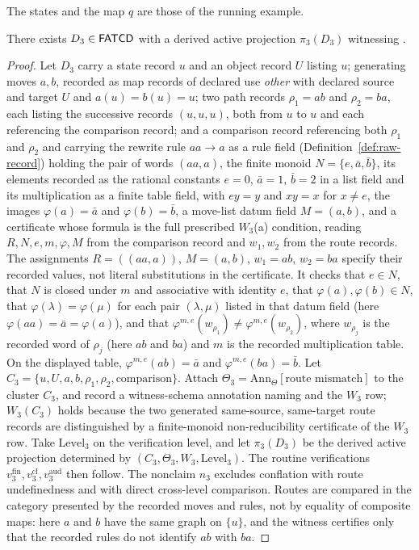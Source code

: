 The states and the map \(q\) are those of the running example.

\begin{proposition}\label{prop:p3-witness}
There exists \(D_3 \in \mathsf{FATCD}{}\) with a derived active projection
\(\pi_3(D_3)\) witnessing \Pthree{}.
\end{proposition}

\begin{proof}
Let \(D_3\) carry a state record \(u\) and an object record \(U\) listing \(u\);
generating moves \(a,b\), recorded as map records of declared use
\emph{other} with declared source and target \(U\) and \(a(u)=b(u)=u\);
two path records \(\rho_1=ab\) and \(\rho_2=ba\), each listing the successive
records \((u,u,u)\), both from \(u\) to \(u\) and each referencing the
comparison record; and a comparison record referencing both \(\rho_1\) and \(\rho_2\) and carrying the
rewrite rule \(aa\to a\) as a rule field (Definition~\ref{def:raw-record}) holding the pair of words \((aa,a)\), the finite monoid \(N=\{e,\bar a,\bar b\}\), its elements recorded as the rational constants \(e=0\), \(\bar a=1\), \(\bar b=2\) in a list field and its multiplication as a finite table field, with
\(ey=y\) and \(xy=x\) for \(x\neq e\), the images \(\varphi(a)=\bar a\) and
\(\varphi(b)=\bar b\), a move-list datum field \(M=(a,b)\), and a certificate whose
formula is the full prescribed \(W_3\)(a) condition, reading \(R,N,e,m,\varphi,M\)
from the comparison record and \(w_1,w_2\) from the route records. The
assignments \(R=((aa,a))\), \(M=(a,b)\), \(w_1=ab\), \(w_2=ba\) specify their
recorded values, not literal substitutions in the certificate. It checks that \(e\in N\), that \(N\) is closed under \(m\) and
associative with identity \(e\), that \(\varphi(a),\varphi(b)\in N\), that \(\varphi(\lambda)=\varphi(\mu)\) for each pair \((\lambda,\mu)\) listed in that datum field (here \(\varphi(aa)=\bar a=\varphi(a)\)), and that
\(\varphi^{m,e}(w_{\rho_1})\ne\varphi^{m,e}(w_{\rho_2})\), where \(w_{\rho_j}\) is the recorded word of \(\rho_j\) (here \(ab\) and \(ba\)) and \(m\) is
the recorded multiplication table. On the displayed table,
\(\varphi^{m,e}(ab)=\bar a\) and
\(\varphi^{m,e}(ba)=\bar b\). Let
\(C_3=\{u,U,a,b,\rho_1,\rho_2,\text{comparison}\}\).
Attach \(\Theta_3 = \mathrm{Ann}_\Theta[\text{route mismatch}]\) to the
cluster \(C_3\), and
record a witness-schema annotation naming \Pthree{} and the \(W_3\) row;
\(W_3(C_3)\) holds because the two generated same-source, same-target route
records are distinguished by a finite-monoid non-reducibility
certificate of the \(W_3\) row. Take \(\mathrm{Level}_3\) on the
verification level, and let \(\pi_3(D_3)\) be the derived active
projection determined by
\((C_3,\Theta_3,W_3,\mathrm{Level}_3)\). The routine verifications
\(v_3^{\mathrm{fin}}, v_3^{\mathrm{cl}}, v_3^{\mathrm{aud}}\) then
follow. The nonclaim \(n_3\) excludes conflation with
\Pone{} route undefinedness and with direct cross-level comparison.
Routes are compared in the category presented by the recorded moves and rules,
not by equality of composite maps: here \(a\) and \(b\) have the same graph on
\(\{u\}\), and the witness certifies only that the recorded rules do not
identify \(ab\) with \(ba\).
\end{proof}

